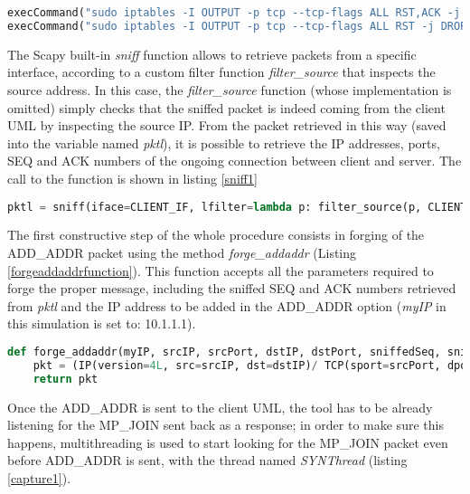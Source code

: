 \begin{lstlisting}[language=python, caption=Disabling RST outgoing packets, label=norst]
execCommand("sudo iptables -I OUTPUT -p tcp --tcp-flags ALL RST,ACK -j DROP", shell = True)
execCommand("sudo iptables -I OUTPUT -p tcp --tcp-flags ALL RST -j DROP", shell = True)
\end{lstlisting}

The Scapy built-in \textit{sniff} function allows to retrieve packets from a specific interface, according to a custom filter function \textit{filter\_source} that inspects the source address. In this case, the \textit{filter\_source} function (whose implementation is omitted) simply checks that the sniffed packet is indeed coming from the client UML by inspecting the source IP. From the packet retrieved in this way (saved into the variable named \textit{pktl}), it is possible to retrieve the IP addresses, ports, SEQ and ACK numbers of the ongoing connection between client and server. The call to the function is shown in listing \ref{sniff1}

\begin{lstlisting}[language=python, caption=Sniffing a first packet from the client, label=sniff1]
pktl = sniff(iface=CLIENT_IF, lfilter=lambda p: filter_source(p, CLIENT_IP), count=1)
\end{lstlisting}

The first constructive step of the whole procedure consists in forging of the ADD\_ADDR packet using the method \textit{forge\_addaddr} (Listing \ref{forgeaddaddrfunction}). This function accepts all the parameters required to forge the proper message, including the sniffed SEQ and ACK numbers retrieved from \textit{pktl} and the IP address to be added in the ADD\_ADDR option (\textit{myIP} in this simulation is set to: 10.1.1.1).

\begin{lstlisting}[language=python, caption=\textit{forge\_addaddr()} implementation, label=forgeaddaddrfunction]
def forge_addaddr(myIP, srcIP, srcPort, dstIP, dstPort, sniffedSeq, sniffedAck):
    pkt = (IP(version=4L, src=srcIP, dst=dstIP)/ TCP(sport=srcPort, dport=dstPort, flags="A", seq=sniffedSeq, ack=sniffedAck, options=[TCPOption_MP(mptcp=MPTCP_AddAddr(address_id=ADDRESS_ID, adv_addr=myIP))]))
    return pkt
\end{lstlisting}

Once the ADD\_ADDR is sent to the client UML, the tool has to be already listening for the MP\_JOIN sent back as a response; in order to make sure this happens, multithreading is used to start looking for the MP\_JOIN packet even before ADD\_ADDR is sent, with the thread named \textit{SYNThread} (listing \ref{capture1}).


